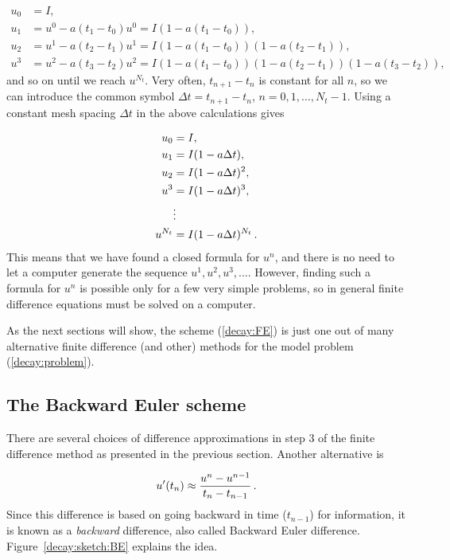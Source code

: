 \documentclass[%
oneside,                 %
final,                   %
10pt]{article}
\begin{document}
\begin{align*}
u_0 &= I,\\ 
u_1 & = u^0 - a(t_{1} -t_0)u^0 = I(1-a(t_1-t_0)),\\ 
u_2 & = u^1 - a(t_{2} -t_1)u^1 = I(1-a(t_1-t_0))(1 - a(t_2-t_1)),\\ 
u^3 &= u^2 - a(t_{3} -t_2)u^2 = I(1-a(t_1-t_0))(1 - a(t_2-t_1))(1 - a(t_3-t_2)),
\end{align*}
and so on until we reach $u^{N_t}$.
Very often, $t_{n+1}-t_n$ is constant for all $n$, so we can introduce
the common symbol
$\Delta t = t_{n+1}-t_n$, $n=0,1,\ldots,N_t-1$.
Using a constant mesh spacing $\Delta t$ in the above calculations gives

\begin{align*}
u_0 &= I,\\ 
u_1 & = I(1-a\Delta t),\\ 
u_2 & = I(1-a\Delta t)^2,\\ 
u^3 &= I(1-a\Delta t)^3,\\ 
&\vdots\\ 
u^{N_t} &= I(1-a\Delta t)^{N_t}\thinspace .
\end{align*}
This means that we have found a closed formula for $u^n$, and there is
no need to let a computer generate the sequence $u^1, u^2, u^3, \ldots$.
However, finding such a formula for $u^n$ is possible only for a few very
simple problems, so in general finite difference equations must be
solved on a computer.

As the next sections will show, the scheme (\ref{decay:FE}) is just one
out of many alternative finite difference (and other) methods for
the model problem (\ref{decay:problem}).

\subsection{The Backward Euler scheme}
\label{decay:schemes:BE}

 

There are several choices of difference approximations in step 3 of
the finite difference method as presented in the previous section.
Another alternative is

\begin{equation}
u^{\prime}(t_n) \approx \frac{u^{n}-u^{n-1}}{t_{n}-t_{n-1}}\thinspace .
\label{decay:BEdiff}
\end{equation}
Since this difference is based on going backward in time ($t_{n-1}$)
for information, it is known as a \emph{backward} difference, also called
Backward Euler difference.
Figure~\ref{decay:sketch:BE} explains the idea.
\end{document}
